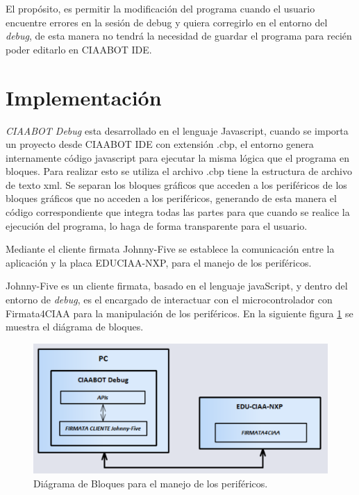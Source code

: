 El propósito, es permitir la modificación del programa cuando el usuario encuentre errores en la sesión de debug y quiera corregirlo en el entorno del \emph{debug}, de esta manera no tendrá la necesidad de guardar el programa para recién poder editarlo en CIAABOT IDE.


\section{Implementación}
\label{sec:Implementación}

\emph{CIAABOT Debug} esta desarrollado en el lenguaje Javascript, cuando se importa un proyecto desde CIAABOT IDE con extensión .cbp, el entorno genera internamente código javascript para ejecutar la misma lógica que el programa en bloques. 
Para realizar esto se utiliza el archivo .cbp tiene la estructura de archivo de texto xml. Se separan los bloques gráficos que acceden a los periféricos de los bloques gráficos que no acceden a los periféricos, generando de esta manera el código correspondiente que integra todas las partes para que cuando se realice la ejecución del programa, lo haga de forma transparente para el usuario.

Mediante el cliente firmata Johnny-Five se establece la comunicación entre la aplicación y la placa EDUCIAA-NXP, para el manejo de los periféricos. 

Johnny-Five es un cliente firmata, basado en el lenguaje javaScript, y dentro del entorno de \emph{debug}, es el encargado de interactuar con el microcontrolador con Firmata4CIAA para la manipulación de los periféricos.
En la siguiente figura \ref{fig:diagrama-bloques} se muestra el diágrama de bloques.

\begin{figure}[!htbp]
	\centering
	\includegraphics*[width=13cm]{./Figures/diagrama-bloques-2.PNG}
	\caption{Diágrama de Bloques para el manejo de los periféricos.}
	\par\label{fig:diagrama-bloques}
\end{figure}

